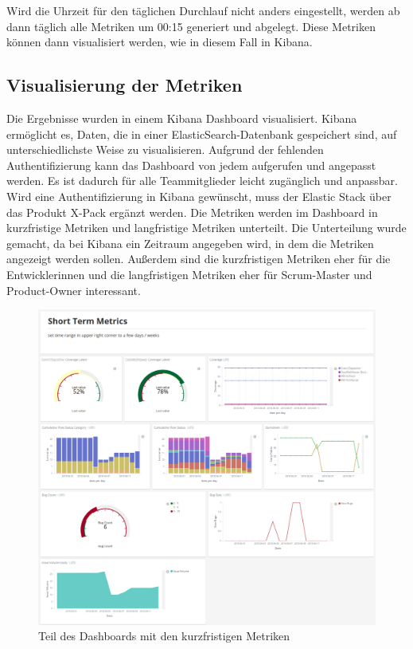 Wird die Uhrzeit für den täglichen Durchlauf nicht anders eingestellt, werden ab dann täglich alle Metriken um 00:15 generiert und abgelegt.
Diese Metriken können dann visualisiert werden, wie in diesem Fall in Kibana.

\clearpage
\subsection{Visualisierung der Metriken}

Die Ergebnisse wurden in einem Kibana Dashboard visualisiert.
Kibana ermöglicht es, Daten, die in einer ElasticSearch-Datenbank gespeichert sind, auf unterschiedlichste Weise zu visualisieren.
Aufgrund der fehlenden Authentifizierung kann das Dashboard von jedem aufgerufen und angepasst werden.
Es ist dadurch für alle Teammitglieder leicht zugänglich und anpassbar.
Wird eine Authentifizierung in Kibana gewünscht, muss der Elastic Stack über das Produkt X-Pack ergänzt werden.
Die Metriken werden im Dashboard in kurzfristige Metriken und langfristige Metriken unterteilt.
Die Unterteilung wurde gemacht, da bei Kibana ein Zeitraum angegeben wird, in dem die Metriken angezeigt werden sollen.
Außerdem sind die kurzfristigen Metriken eher für die Entwicklerinnen und die langfristigen Metriken eher für Scrum-Master und Product-Owner interessant.

\begin{savenotes}
    \begin{figure}[H] 
        \centering
            \includegraphics[width=1.0\textwidth]{img/dashboard-short-term.png}
        \caption{Teil des Dashboards mit den kurzfristigen Metriken}\label{fig:dashboard-short-term}
    \end{figure}
\end{savenotes}

